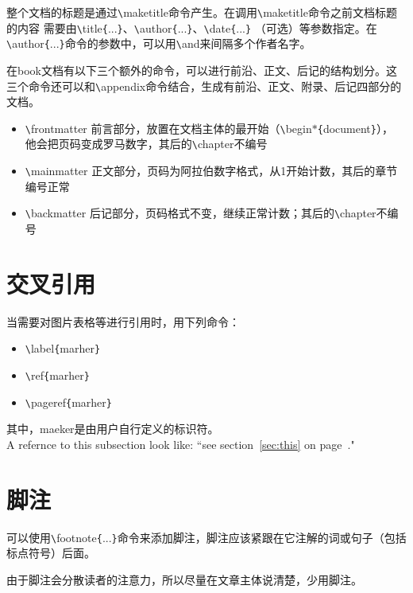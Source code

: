 \documentclass[UTF8]{ctexart}
\begin{document}
整个文档的标题是通过\texttt{\textbackslash}maketitle命令产生。在调用\texttt{\textbackslash}maketitle命令之前文档标题的内容
需要由\texttt{\textbackslash}title\texttt{\{}...\texttt{\}}、\texttt{\textbackslash}author\texttt{\{}...\texttt{\}}、\texttt{\textbackslash}date\texttt{\{}...\texttt{\}}
（可选）等参数指定。在\texttt{\textbackslash}author\texttt{\{}...\texttt{\}}命令的参数中，可以用\texttt{\textbackslash}and来间隔多个作者名字。

\LaTeXe 在book文档有以下三个额外的命令，可以进行前沿、正文、后记的结构划分。这三个命令还可以和\texttt{\textbackslash}appendix命令结合，生成有前沿、正文、附录、后记四部分的文档。
\begin{itemize}
 \item \texttt{\textbackslash}frontmatter 前言部分，放置在文档主体的最开始（\texttt{\textbackslash}begin{$*$}\texttt{\{}document\texttt{\}}），
 他会把页码变成罗马数字，其后的\texttt{\textbackslash}chapter不编号
 \item \texttt{\textbackslash}mainmatter 正文部分，页码为阿拉伯数字格式，从1开始计数，其后的章节编号正常
 \item \texttt{\textbackslash}backmatter 后记部分，页码格式不变，继续正常计数；其后的\texttt{\textbackslash}chapter不编号
\end{itemize}
\section{交叉引用}
当需要对图片表格等进行引用时，用下列命令：
\begin{itemize}
  \item \texttt{\textbackslash}label\texttt{\{}marher\texttt{\}}
  \item \texttt{\textbackslash}ref\texttt{\{}marher\texttt{\}}
  \item \texttt{\textbackslash}pageref\texttt{\{}marher\texttt{\}}
\end{itemize}
其中，maeker是由用户自行定义的标识符。
\\

A refernce to this subsection
\label{sec:this} look like:
``see section~\ref{sec:this} on
page~\pageref{sec:this}."
\section{脚注}
可以使用\texttt{\textbackslash}footnote\texttt{\{}...\texttt{\}}命令来添加脚注，脚注应该紧跟在它注解的词或句子（包括标点符号）后面。

由于脚注会分散读者的注意力，所以尽量在文章主体说清楚，少用脚注。
\\
\end{document}
